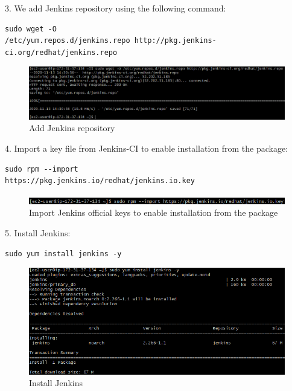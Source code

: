 \documentclass[12pt,a4paper,twoside]{article}
\begin{document}
3. We add Jenkins repository using the following command:


\begin{verbatim}
sudo wget -O
/etc/yum.repos.d/jenkins.repo http://pkg.jenkins-
ci.org/redhat/jenkins.repo
\end{verbatim}


\begin{figure}[H]
    \centering
        \includegraphics[width=15cm]{images-aws/16-download-jenkins.png}
        \caption{Add Jenkins repository}
\end{figure}


4. Import a key file from Jenkins-CI to enable installation from the package:


\begin{verbatim}
sudo rpm --import
https://pkg.jenkins.io/redhat/jenkins.io.key
\end{verbatim}


\begin{figure}[H]
    \centering
        \includegraphics[width=15cm]{images-aws/17-import-jenkins-keys.png}
        \caption{Import Jenkins official keys to enable installation from the package}
\end{figure}


5. Install Jenkins:


\begin{verbatim}
sudo yum install jenkins -y
\end{verbatim}


\begin{figure}[H]
    \centering
        \includegraphics[width=15cm]{images-aws/18-install-jenkins.png}
        \caption{Install Jenkins}
\end{figure}
\end{document}
